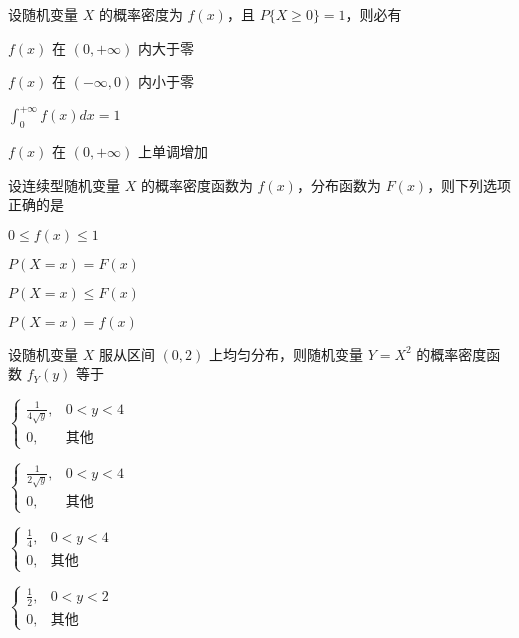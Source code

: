 \documentclass{exam-zh}
\begin{document}
\begin{question}
  设随机变量 $X$ 的概率密度为 $f(x)$，且 $P\{X \geq 0\} = 1$，则必有 \paren[C]
  \begin{choices}
    \item $f(x)$ 在 $(0, +\infty)$ 内大于零
    \item $f(x)$ 在 $(-\infty, 0)$ 内小于零
    \item $\int_{0}^{+\infty} f(x) dx = 1$  
    \item $f(x)$ 在 $(0, +\infty)$ 上单调增加
  \end{choices}
\end{question}

\begin{question}
  设连续型随机变量 $X$ 的概率密度函数为 $f(x)$，分布函数为 $F(x)$，则下列选项正确的是 \paren[C]
  \begin{choices}
    \item $0 \leq f(x) \leq 1$
    \item $P(X = x) = F(x)$  
    \item $P(X = x) \leq F(x)$  
    \item $P(X = x) = f(x)$  
  \end{choices}
\end{question}

\begin{question}
  设随机变量 $X$ 服从区间 $(0,2)$ 上均匀分布，则随机变量 $Y = X^2$ 的概率密度函数 $f_Y(y)$ 等于 \paren[A]
  \begin{choices}
    \item 
    $
    \begin{cases} 
    \frac{1}{4\sqrt{y}}, & 0 < y < 4 \\ 
    0, & \text{其他} 
    \end{cases}
    $
    
    \item 
    $
    \begin{cases} 
    \frac{1}{2\sqrt{y}}, & 0 < y < 4 \\ 
    0, & \text{其他} 
    \end{cases}
    $
    
    \item 
    $
    \begin{cases} 
    \frac{1}{4}, & 0 < y < 4 \\ 
    0, & \text{其他} 
    \end{cases}
    $
    
    \item 
    $
    \begin{cases} 
    \frac{1}{2}, & 0 < y < 2 \\ 
    0, & \text{其他} 
    \end{cases}
    $
  \end{choices}
\end{question}
\end{document}
